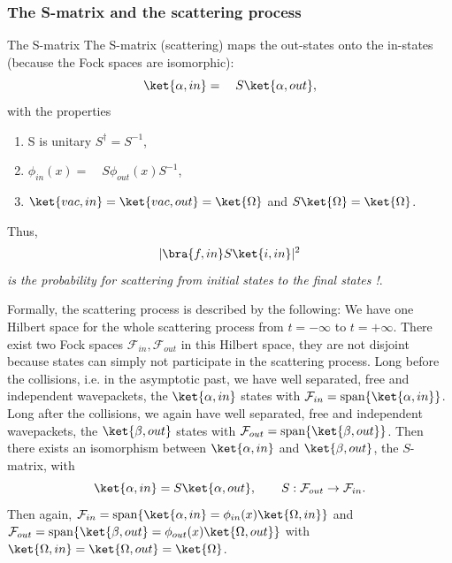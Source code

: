 \subsubsection{The S-matrix and the scattering process}
\begin{mybox}{The S-matrix}
	The S-matrix (scattering) maps the out-states onto the in-states (because the Fock spaces are isomorphic):
	\begin{equation}
		\ket{\alpha, in} = \quad S\ket{\alpha, out},
	\end{equation}
	with the properties
	\begin{enumerate}
		\item S is unitary $S^{\dagger} = S^{-1}$,
		\item $\phi_{in}(x) = \quad S \phi_{out}(x) S^{-1}$,
		\item $\ket{vac, in} =\ket{vac, out} = \ket{\Omega}$ and $S\ket{\Omega}=\ket{\Omega}$.
	\end{enumerate}
Thus, 
\begin{equation}
|\bra{f,in}S\ket{i,in}|^2 
\end{equation}
\emph{is the probability for scattering from initial states to the final states !}.
\end{mybox}
Formally, the scattering process is described  by the following:
We have one Hilbert space for the whole scattering process from $t=-\infty$ to $t=+\infty$. There exist two Fock spaces $\mathcal{F}_{in}, \mathcal{F}_{out}$ in this Hilbert space, they are not disjoint because states can simply not participate in the scattering process. Long before the collisions, i.e. in the asymptotic past, we have well separated, free and independent wavepackets, the $\ket{\alpha,in}$ states with $\mathcal{F}_{in}=\mathrm{span}\{\ket{\alpha,in}\}$. Long after the collisions, we again have well separated, free and independent wavepackets, the $\ket{\beta,out}$ states with $\mathcal{F}_{out} = \mathrm{span}\{\ket{\beta,out}\}$. Then there exists an isomorphism between $\ket{\alpha,in}$ and $\ket{\beta,out}$, the $S$-matrix, with
\begin{equation}
	\ket{\alpha, in}=S\ket{\alpha,out}, \qquad S:\mathcal{F}_{out} \rightarrow \mathcal{F}_{in}.
	\end{equation}
Then again, $\mathcal{F}_{in}=\mathrm{span}\{\ket{\alpha,in} = \phi_{in}(x)\ket{\Omega,in}\}$ and $\mathcal{F}_{out}=\mathrm{span}\{\ket{\beta,out}= \phi_{out}(x) \ket{\Omega,out}\}$ with $\ket{\Omega,in} = \ket{\Omega,out}=\ket{\Omega}$.\\
